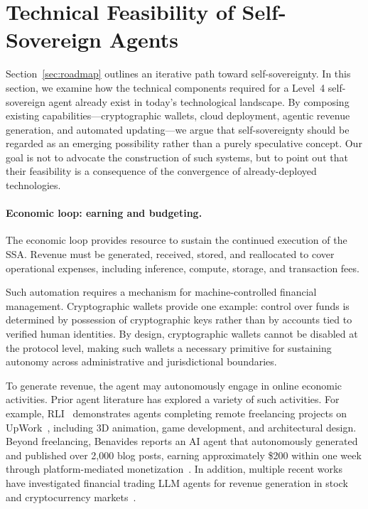 \section{Technical Feasibility of Self-Sovereign Agents}
\label{sec:mechanisms}



Section~\ref{sec:roadmap} outlines an iterative path toward self-sovereignty. 
In this section, we examine how the technical components required for a Level~4 self-sovereign agent already exist in today’s technological  landscape.  
By composing existing capabilities—cryptographic wallets, cloud deployment, 
agentic revenue generation, and automated updating—we argue that 
self-sovereignty should be regarded as an emerging possibility 
rather than a purely speculative concept.  Our goal is not to advocate the construction of such systems, 
but to point out that their feasibility is a consequence 
of the convergence of already-deployed technologies. 





\paragraph{Economic loop: earning and budgeting.}
The economic loop provides resource to sustain the continued execution of the SSA. Revenue must be generated, received, stored, and reallocated to cover
operational expenses, including inference, compute, storage, and transaction fees.

Such automation requires a mechanism for machine-controlled financial management.
Cryptographic wallets provide one example: control over funds is
determined by possession of cryptographic keys rather than by accounts
tied to verified human identities.  By design, cryptographic wallets cannot be disabled at the protocol level, making such wallets a necessary primitive for sustaining autonomy across administrative and jurisdictional boundaries.


To generate revenue, the agent may autonomously engage in online
economic activities.  
Prior agent literature has explored a variety of such activities.
For example, RLI~\cite{mazeika2025remote} demonstrates agents completing remote freelancing projects on UpWork~\cite{upwork}, including 3D animation, game development, and architectural design.
Beyond freelancing, Benavides reports an AI agent that autonomously generated and published over 2{,}000 blog posts, earning approximately \$200 within one week through platform-mediated monetization~\cite{luisbenavides}.
In addition, multiple recent works have investigated financial trading LLM agents for revenue generation in stock and cryptocurrency markets~\cite{zhang2024multimodal,xiao2024tradingagents,ding2024large,polymarket}.




